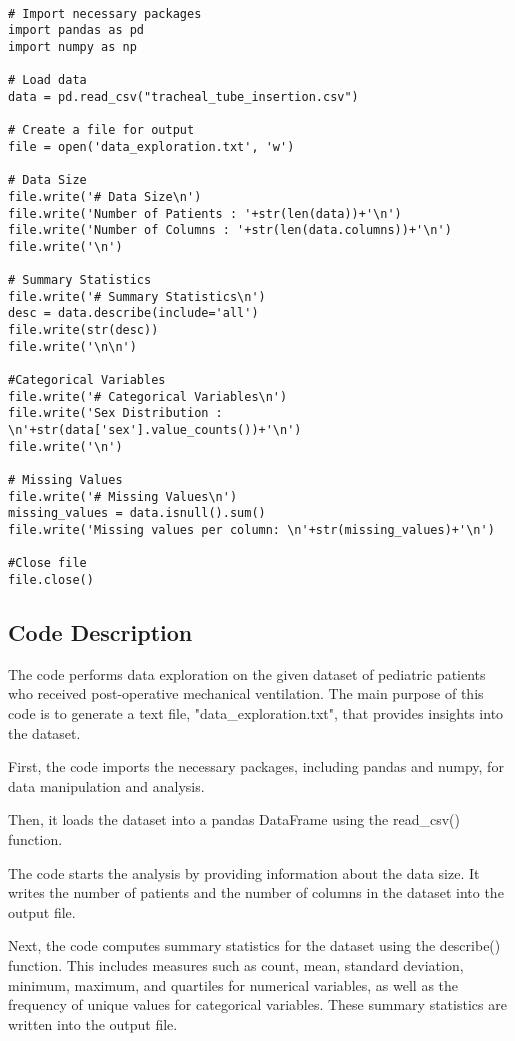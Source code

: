 \documentclass[11pt]{article}
\begin{document}
\begin{verbatim}

# Import necessary packages
import pandas as pd
import numpy as np

# Load data
data = pd.read_csv("tracheal_tube_insertion.csv")

# Create a file for output
file = open('data_exploration.txt', 'w')

# Data Size
file.write('# Data Size\n')
file.write('Number of Patients : '+str(len(data))+'\n')
file.write('Number of Columns : '+str(len(data.columns))+'\n')
file.write('\n')

# Summary Statistics
file.write('# Summary Statistics\n')
desc = data.describe(include='all')
file.write(str(desc))
file.write('\n\n')

#Categorical Variables
file.write('# Categorical Variables\n')
file.write('Sex Distribution : \n'+str(data['sex'].value_counts())+'\n')
file.write('\n')

# Missing Values
file.write('# Missing Values\n')
missing_values = data.isnull().sum()
file.write('Missing values per column: \n'+str(missing_values)+'\n')

#Close file
file.close()

\end{verbatim}

\subsection{Code Description}

The code performs data exploration on the given dataset of pediatric patients who received post-operative mechanical ventilation. The main purpose of this code is to generate a text file, "data\_exploration.txt", that provides insights into the dataset.

First, the code imports the necessary packages, including pandas and numpy, for data manipulation and analysis.

Then, it loads the dataset into a pandas DataFrame using the read\_csv() function.

The code starts the analysis by providing information about the data size. It writes the number of patients and the number of columns in the dataset into the output file.

Next, the code computes summary statistics for the dataset using the describe() function. This includes measures such as count, mean, standard deviation, minimum, maximum, and quartiles for numerical variables, as well as the frequency of unique values for categorical variables. These summary statistics are written into the output file.
\end{document}
